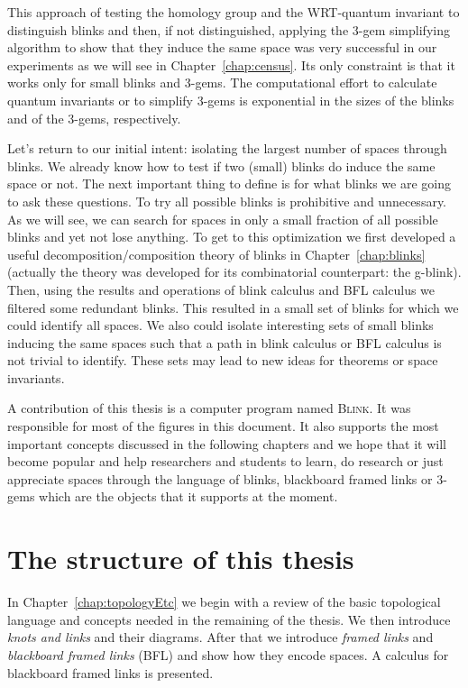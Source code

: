 This approach of testing the homology group and the WRT-quantum invariant
to distinguish blinks and then, if not distinguished,
applying the 3-gem simplifying algorithm to show that they induce
the same space was very successful in our experiments as we will
see in Chapter~\ref{chap:census}. Its only constraint is that
it works only for small blinks and 3-gems. The computational
effort to calculate quantum invariants or to simplify 3-gems is exponential
in the sizes of the blinks and of the 3-gems, respectively.

Let's return to our initial intent: isolating the largest number of
spaces through blinks. We already know how to test if two (small)
blinks do induce the same space or not. The next important thing
to define is for what blinks we are going to ask these questions.
To try all possible blinks is prohibitive and unnecessary. As we
will see, we can search for spaces in only a small fraction of all possible
blinks and yet not lose anything. To get to this optimization
we first developed a useful decomposition/composition theory
of blinks in Chapter~\ref{chap:blinks} (actually the theory was developed
for its combinatorial counterpart: the g-blink). Then, using the
results and operations of blink calculus and BFL calculus we filtered
some redundant blinks. This resulted in a small set of blinks for which we
could identify all spaces. We also could isolate interesting sets
of small blinks inducing the same spaces such that a path in blink
calculus or BFL calculus is not trivial to identify. These sets may
lead to new ideas for theorems or space invariants.

A contribution of this thesis is a computer program named \textsc{Blink}.
It was responsible for most of the figures in this document. It also
supports the most important concepts discussed in the following
chapters and we hope that it will become popular and help researchers and
students to learn, do research or just appreciate spaces through
the language of blinks, blackboard framed links or 3-gems which are
the objects that it supports at the moment.

\section{The structure of this thesis}

In Chapter~\ref{chap:topologyEtc} we begin with a
review of the basic topological language and concepts needed in the remaining of
the thesis. We then introduce {\it knots and links} and their diagrams.
After that we introduce {\it framed links} and
{\it blackboard framed links} (BFL) and show how they encode spaces.
A calculus for blackboard framed links is presented.

